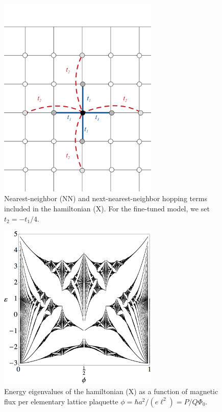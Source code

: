 \documentclass[aps,prb,twocolumn,letterpaper,twoside,nobalancelastpage,groupedaddress,amsmath,amssymb,floatfix,citeautoscript]{revtex4-1}
\begin{document}
\begin{figure}[thb]
\centering
\includegraphics[width=3in]{quartic-hofstadter-hoppings-2.pdf}
\caption{\label{hoppings} Nearest-neighbor (NN) and next-nearest-neighbor hopping terms included in the hamiltonian (X). For the fine-tuned model, we set $t_2 = -t_1/4$.}
\end{figure}

\begin{figure}[thb]
\centering
\includegraphics[width=3in]{quartic-butterfly-3.pdf}
\caption{\label{butterfly-plot} Energy eigenvalues of the hamiltonian (X) as a function of magnetic flux per elementary lattice plaquette $\phi = \hbar a^2/(e \ell^2) = P/Q \Phi_0$.}
\end{figure}
\end{document}
